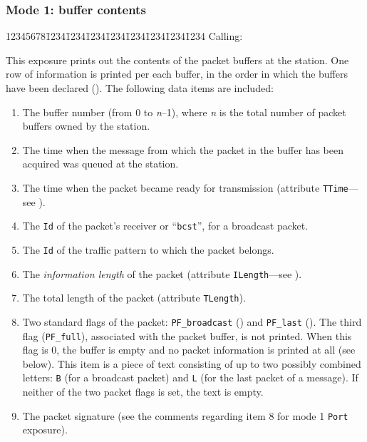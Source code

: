 \subsubsection*{Mode 1: buffer contents}

{\tt\begin{tabbing}
12345678\=1234\=1234\=1234\=1234\=1234\=1234\=1234\=1234\kill
{\rm Calling:}
\end{tabbing}}

This exposure prints out the contents of the packet buffers at the station.
One row of information is printed per each buffer, in the order
in which the buffers have been declared ().
The following data items are included:

\begin{enumerate}
\item
The buffer number (from 0 to {\em n\/}--1), where {\em n\/} is the total number of packet
buffers owned by the station.
\item
The time when the message from which the packet in the buffer has been
acquired was queued at the station.
\item
The time when the packet became ready for transmission (attribute
{\tt TTime}---see ).
\item
The {\tt Id} of the packet's receiver or ``{\tt bcst}'', for a broadcast
packet.
\item
The {\tt Id} of the traffic pattern to which the packet belongs.
\item
The {\em information length\/} of the packet (attribute {\tt ILength}---see
).
\item
The total length of the packet (attribute {\tt TLength}).
\item
Two standard flags of the packet: {\tt PF\_broadcast} ()
and {\tt PF\_last} ().
The third flag ({\tt PF\_full}), associated with the packet buffer, is not
printed.
When this flag is 0, the buffer is empty and no packet information is
printed at all (see below).
This item is a piece of text consisting of up to two possibly
combined letters: {\tt B} (for a broadcast packet) and {\tt L} (for the
last packet of a message).
If neither of the two packet flags is set, the text is empty.
\item
The packet signature (see the comments regarding item 8 for mode 1
{\tt Port} exposure).
\end{enumerate}

